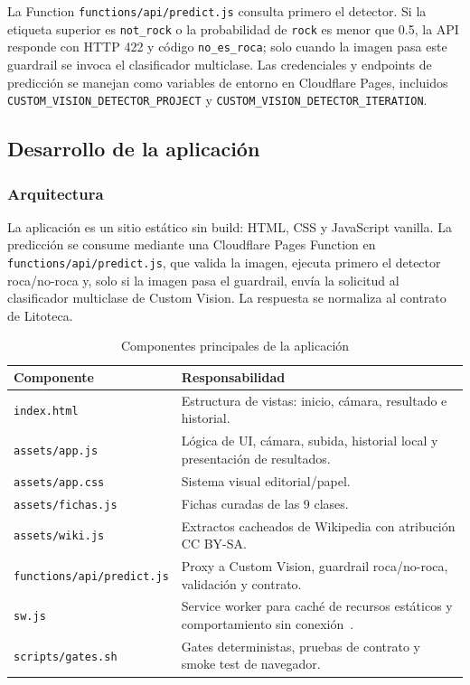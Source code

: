 La Function \texttt{functions/api/predict.js} consulta primero el detector. Si la
etiqueta superior es \texttt{not\_rock} o la probabilidad de \texttt{rock} es menor
que 0.5, la API responde con HTTP 422 y código \texttt{no\_es\_roca}; solo cuando la
imagen pasa este guardrail se invoca el clasificador multiclase. Las credenciales y
endpoints de predicción se manejan como variables de entorno en Cloudflare Pages,
incluidos \texttt{CUSTOM\_VISION\_DETECTOR\_PROJECT} y
\texttt{CUSTOM\_VISION\_DETECTOR\_ITERATION}.

\subsection{Desarrollo de la aplicación}

\subsubsection{Arquitectura}

La aplicación es un sitio estático sin build: HTML, CSS y JavaScript vanilla. La
predicción se consume mediante una Cloudflare Pages Function en
\texttt{functions/api/predict.js}, que valida la imagen, ejecuta primero el detector
roca/no-roca y, solo si la imagen pasa el guardrail, envía la solicitud al
clasificador multiclase de Custom Vision. La respuesta se normaliza al contrato de
Litoteca.

\begin{table}[H]
  \centering
  \caption{Componentes principales de la aplicación}
  \label{tab:componentes}
  \begin{tabular}{@{}p{3.8cm}p{8.6cm}@{}}
    \toprule
    Componente & Responsabilidad \\
    \midrule
    \texttt{index.html} & Estructura de vistas: inicio, cámara, resultado e historial. \\
    \texttt{assets/app.js} & Lógica de UI, cámara, subida, historial local y presentación de resultados. \\
    \texttt{assets/app.css} & Sistema visual editorial/papel. \\
    \texttt{assets/fichas.js} & Fichas curadas de las 9 clases. \\
    \texttt{assets/wiki.js} & Extractos cacheados de Wikipedia con atribución CC BY-SA. \\
    \texttt{functions/api/predict.js} & Proxy a Custom Vision, guardrail roca/no-roca, validación y contrato. \\
    \texttt{sw.js} & Service worker para caché de recursos estáticos y comportamiento sin conexión~\cite{w3cserviceworkers}. \\
    \texttt{scripts/gates.sh} & Gates deterministas, pruebas de contrato y smoke test de navegador. \\
    \bottomrule
  \end{tabular}
\end{table}

